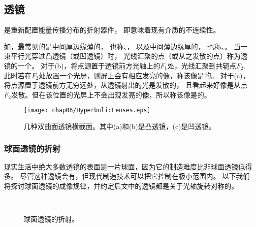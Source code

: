 \subsection{透镜}\label{sub:透镜}
\begin{definition}
    是重新配置能量传播分布的折射器件，
    即意味着现有介质的不连续性。
\end{definition}

如，最常见的是中间厚边缘薄的，
也称、，
以及中间薄边缘厚的，
也称、。
当一束平行光穿过凸透镜（或凹透镜）时，
光线汇聚的点（或从之发散的点）称为透镜的一个。
对于(b)，将点源置于透镜前方光轴上的$F_1$处，光线汇聚到共轭点$F_2$.
此时若在$F_2$处放置一个光屏，则屏上会有相应发亮的像，称该像是的。
对于(c)，将点源置于透镜前方无穷远处，从透镜射出的光是发散的，
且看起来好像是从点$F_2$发散。但在该位置的光屏上不会出现发亮的像，所以称该像是的。
\begin{figure}[htbp]
    \centering\texttt{[image: chap06/HyperbolicLenses.eps]}
    \caption{几种双曲面透镜横截面。其中(a)和(b)是凸透镜，(c)是凹透镜。}
    \label{fig:6.30}
\end{figure}

\subsubsection{球面透镜的折射}
现实生活中绝大多数透镜的表面是一片球面，因为它的制造难度比非球面透镜低得多。
尽管这种透镜会有，但现代制造技术可以把它控制在极小范围内。
以下我们将探讨球面透镜的成像规律，并约定后文中的透镜都是关于光轴旋转对称的。
\begin{figure}[htbp]
    \centering
    \,
    \caption{球面透镜的折射。}
    \label{fig:6.31}
\end{figure}


